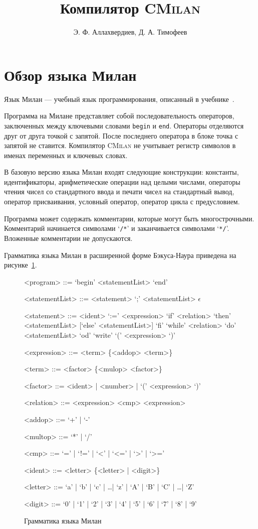 \documentclass[a4paper,12pt]{article}
\title{Компилятор \textsc{CMilan}}
\author{Э. Ф. Аллахвердиев, Д. А. Тимофеев}
\begin{document}
\maketitle
\tableofcontents

\section{Обзор языка Милан}

Язык Милан --- учебный язык программирования, описанный в
учебнике~\cite{karpov05}.

Программа на Милане представляет собой последовательность операторов,
заключенных между ключевыми словами \texttt{begin} и \texttt{end}. Операторы
отделяются друг от друга точкой с запятой. После последнего оператора в блоке
точка с запятой не ставится. Компилятор \textsc{CMilan} не учитывает регистр
символов в именах переменных и ключевых словах.

В базовую версию языка Милан входят следующие конструкции: константы,
идентификаторы, арифметические операции над целыми числами, операторы чтения
чисел со стандартного ввода и печати чисел на стандартный вывод, оператор
присваивания, условный оператор, оператор цикла с предусловием.

Программа может содержать комментарии, которые могут быть многострочными.
Комментарий начинается символами `\texttt{/*}' и заканчивается символами
`\texttt{*/}'. Вложенные комментарии не допускаются.

Грамматика языка Милан в расширенной форме Бэкуса-Наура приведена на
рисунке~\ref{milan-grammar}.

\begin{figure}
\begin{grammar}

<program> ::= `begin' <statementList> `end'

<statementList> ::= <statement> `;' <statementList> 
  \alt $\epsilon$

<statement> ::= <ident> `:=' <expression>
  \alt `if' <relation> `then' <statementList> [`else' <statementList>] `fi'
  \alt `while' <relation> `do' <statementList> `od'
  \alt `write' `(' <expression> `)'

<expression> ::= <term> \{<addop> <term>\}

<term> ::= <factor> \{<mulop> <factor>\}

<factor> ::= <ident> | <number> | `(' <expression> `)'

<relation> ::= <expression> <cmp> <expression>

<addop> ::= `+' | `-'

<multop> ::= `*' | `/'

<cmp> ::= `=' | `!=' | `<' | `<=' | `>' | `>='

<ident> ::= <letter> \{<letter> | <digit>\}

<letter> ::= `a' | `b' | `c' | \ldots | `z' | `A' | `B' | `C' | \ldots | `Z'

<digit> ::= `0' | `1' | `2' | `3' | `4' | `5' | `6' | `7' | `8' | `9'

\end{grammar}
\label{milan-grammar}
\caption{Грамматика языка Милан}
\end{figure}
\end{document}
